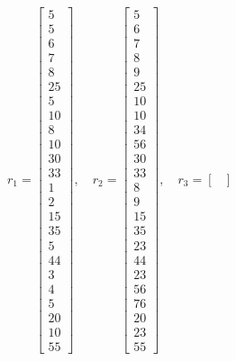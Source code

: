 \[
r_1 = \begin{bmatrix}
5 \\ 5 \\ 6 \\ 7 \\ 8 \\ 25 \\ 5 \\ 10 \\ 8 \\ 10 \\ 30 \\ 33 \\ 1 \\ 2 \\ 15 \\ 35 \\ 5 \\ 44 \\ 3 \\ 4 \\ 5 \\ 20 \\ 10 \\ 55
\end{bmatrix}, \quad
r_2 = \begin{bmatrix}
5 \\ 6 \\ 7 \\ 8 \\ 9 \\ 25 \\ 10 \\ 10 \\ 34 \\ 56 \\ 30 \\ 33 \\ 8 \\ 9 \\ 15 \\ 35 \\ 23 \\ 44 \\ 23 \\ 56 \\ 76 \\ 20 \\ 23 \\ 55
\end{bmatrix}, \quad
r_3 = \begin{bmatrix}

\end{bmatrix}\]
